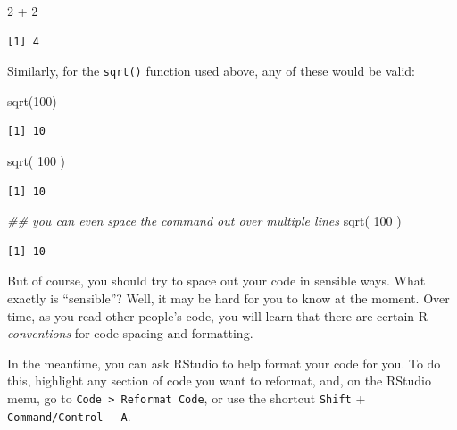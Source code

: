 \documentclass[
  letterpaper,
  DIV=11,
  numbers=noendperiod]{scrreprt}
\newenvironment{Shaded}{\begin{snugshade}}{\end{snugshade}}
\newcommand{\DecValTok}[1]{\textcolor[rgb]{0.68,0.00,0.00}{#1}}
\newcommand{\DocumentationTok}[1]{\textcolor[rgb]{0.37,0.37,0.37}{\textit{#1}}}
\newcommand{\FunctionTok}[1]{\textcolor[rgb]{0.28,0.35,0.67}{#1}}
\newcommand{\NormalTok}[1]{\textcolor[rgb]{0.00,0.23,0.31}{#1}}
\newcommand{\SpecialCharTok}[1]{\textcolor[rgb]{0.37,0.37,0.37}{#1}}
\begin{document}
\begin{Shaded}
\begin{Highlighting}[]
\DecValTok{2}                \SpecialCharTok{+}                   \DecValTok{2}
\end{Highlighting}
\end{Shaded}

\begin{verbatim}
[1] 4
\end{verbatim}

Similarly, for the \texttt{sqrt()} function used above, any of these
would be valid:

\begin{Shaded}
\begin{Highlighting}[]
\FunctionTok{sqrt}\NormalTok{(}\DecValTok{100}\NormalTok{)}
\end{Highlighting}
\end{Shaded}

\begin{verbatim}
[1] 10
\end{verbatim}

\begin{Shaded}
\begin{Highlighting}[]
\FunctionTok{sqrt}\NormalTok{(    }\DecValTok{100}\NormalTok{     )}
\end{Highlighting}
\end{Shaded}

\begin{verbatim}
[1] 10
\end{verbatim}

\begin{Shaded}
\begin{Highlighting}[]
\DocumentationTok{\#\# you can even space the command out over multiple lines}
\FunctionTok{sqrt}\NormalTok{(  }
  \DecValTok{100}
\NormalTok{    )}
\end{Highlighting}
\end{Shaded}

\begin{verbatim}
[1] 10
\end{verbatim}

But of course, you should try to space out your code in sensible ways.
What exactly is ``sensible''? Well, it may be hard for you to know at
the moment. Over time, as you read other people's code, you will learn
that there are certain R \emph{conventions} for code spacing and
formatting.

In the meantime, you can ask RStudio to help format your code for you.
To do this, highlight any section of code you want to reformat, and, on
the RStudio menu, go to \texttt{Code\ \textgreater{}\ Reformat\ Code},
or use the shortcut \texttt{Shift} + \texttt{Command/Control} +
\texttt{A}.
\end{document}
